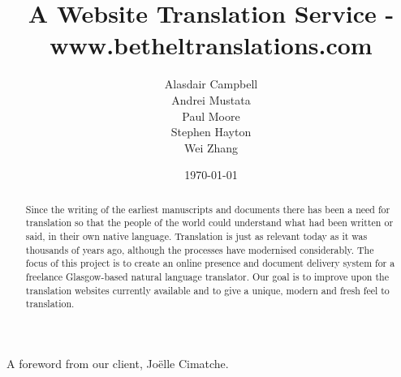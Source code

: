 \documentclass{l3proj}
\begin{document}
\title{A Website Translation Service - www.betheltranslations.com}
\author{Alasdair Campbell \\
	Andrei Mustata \\
	Paul Moore \\
        Stephen Hayton \\
	Wei Zhang}
\date{\today}


\maketitle
\begin{abstract}

Since the writing of the earliest manuscripts and documents there has been a
need for translation so that the people of the world could understand what had
been written or said, in their own native language. Translation is just as
relevant today as it was thousands of years ago, although the processes have
modernised considerably. The focus of this project is to create an online
presence and document delivery system for a freelance Glasgow-based natural
language translator. Our goal is to improve upon the translation websites
currently available and to give a unique, modern and fresh feel to translation.

\end{abstract}
\educationalconsent
\tableofcontents
\newpage
\begin{flushleft}
A foreword from our client, Jo\"{e}lle Cimatche.
\end{flushleft}	
\end{document}
